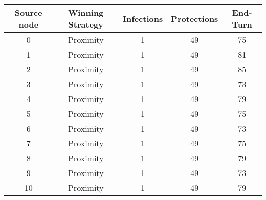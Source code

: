 \documentclass[results.tex]{subfiles}
\begin{document}
    \begin{center}
        \begin{tabular}{| c || c | c | c | c |}
            \hline
            {\bfseries Source node} & {\bfseries Winning Strategy} & {\bfseries Infections} & {\bfseries Protections}
            & {\bfseries End-Turn}
            \\  %
            \hline\hline
            0                       & Proximity                    & 1                      & 49                      & 75                   \\
            \hline
            1                       & Proximity                    & 1                      & 49                      & 81                   \\
            \hline
            2                       & Proximity                    & 1                      & 49                      & 85                   \\
            \hline
            3                       & Proximity                    & 1                      & 49                      & 73                   \\
            \hline
            4                       & Proximity                    & 1                      & 49                      & 79                   \\
            \hline
            5                       & Proximity                    & 1                      & 49                      & 75                   \\
            \hline
            6                       & Proximity                    & 1                      & 49                      & 73                   \\
            \hline
            7                       & Proximity                    & 1                      & 49                      & 75                   \\
            \hline
            8                       & Proximity                    & 1                      & 49                      & 79                   \\
            \hline
            9                       & Proximity                    & 1                      & 49                      & 73                   \\
            \hline
            10                      & Proximity                    & 1                      & 49                      & 79                   \\

\end{tabular}
\end{center}
\end{document}
